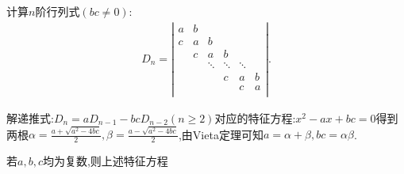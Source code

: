 \documentclass[../../main.tex]{subfiles}
\begin{document}
\begin{corollary}\label{corollary:对角线元素相同的三对角行列式}
计算$n$阶行列式$(bc\ne0)$:
\begin{equation}
\begin{split}
D_n=\left| \begin{matrix}
a&		b&		&		&		&		\\
c&		a&		b&		&		&		\\
&		c&		a&		b&		&		\\
&		&		\ddots&		\ddots&		\ddots&		\\
&		&		&		c&		a&		b\\
&		&		&		&		c&		a\\
\end{matrix} \right|.
\end{split}
\nonumber
\end{equation}
\end{corollary}
\begin{note}
解递推式:$D_n=aD_{n-1}-bcD_{n-2}(n\ge2)$对应的特征方程:$x^2-ax+bc=0$得到两根$\alpha =\frac{a+\sqrt{a^2-4bc}}{2},\beta =\frac{a-\sqrt{a^2-4bc}}{2}$,由Vieta定理可知$a=\alpha+\beta,bc=\alpha\beta$.

若$a,b,c$均为复数,则上述特征方程
\end{note}
\end{document}
